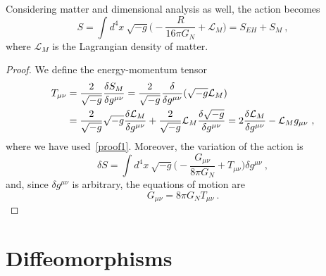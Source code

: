     Considering matter and dimensional analysis as well, the action becomes
    \begin{equation*}
        S = \int d^4 x ~ \sqrt{- g} \Big (- \frac{R}{16 \pi G_N} + \mathcal L_M \Big) = S_{EH} + S_M ~,
    \end{equation*}
    where $\mathcal L_M$ is the Lagrangian density of matter. 
    \begin{proof}
        We define the energy-momentum tensor 
        \begin{equation*}
        \begin{aligned}
            T_{\mu\nu} & = \frac{2}{\sqrt{-g}} \frac{\delta S_M}{\delta g^{\mu\nu}} = \frac{2}{\sqrt{-g}} \frac{\delta }{\delta g^{\mu\nu}} (\sqrt{-g} \mathcal L_M) \\ & = \frac{2}{\sqrt{-g}} \sqrt{-g} \frac{\delta \mathcal L_M}{\delta g^{\mu\nu}} + \frac{2}{\sqrt{-g}} \mathcal L_M \frac{\delta \sqrt{-g}}{\delta g^{\mu\nu}} = 2 \frac{\delta \mathcal L_M}{\delta g^{\mu\nu}} - \mathcal L_M g_{\mu\nu} ~,
        \end{aligned}
        \end{equation*}
        where we have used~\eqref{proof1}. Moreover, the variation of the action is 
        \begin{equation*}
            \delta S = \int d^4 x ~ \sqrt{-g} \Big (- \frac{G_{\mu\nu}}{8 \pi G_N} + T_{\mu\nu}) \delta g^{\mu\nu} ~,
        \end{equation*}
        and, since $\delta g^{\mu\nu}$ is arbitrary, the equations of motion are 
        \begin{equation*}
            G_{\mu\nu} = 8 \pi G_N T_{\mu\nu} ~.
        \end{equation*}
    \end{proof}

\section{Diffeomorphisms} 

